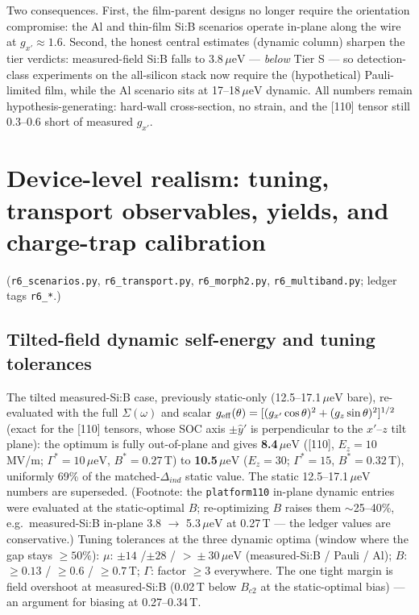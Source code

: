 \documentclass[11pt]{article}
\newcommand{\ueV}{\,\mu\mathrm{eV}}
\begin{document}
Two consequences. First, the film-parent designs no longer require the
orientation compromise: the Al and thin-film Si:B scenarios operate
in-plane along the wire at $g_{x'} \approx 1.6$. Second, the honest central
estimates (dynamic column) sharpen the tier verdicts: measured-field Si:B
falls to 3.8$\ueV$ --- \emph{below} Tier S --- so detection-class
experiments on the all-silicon stack now require the (hypothetical)
Pauli-limited film, while the Al scenario sits at 17--18$\ueV$ dynamic.
All numbers remain hypothesis-generating: hard-wall cross-section, no
strain, and the [110] tensor still 0.3--0.6 short of measured $g_{x'}$.

\section{Device-level realism: tuning, transport observables, yields, and
charge-trap calibration}\label{s:device}
(\texttt{r6\_scenarios.py}, \texttt{r6\_transport.py}, \texttt{r6\_morph2.py},
\texttt{r6\_multiband.py}; ledger tags \texttt{r6\_*}.)

\subsection{Tilted-field dynamic self-energy and tuning tolerances}
\label{s:tilt}
The tilted measured-Si:B case, previously static-only (12.5--17.1$\ueV$
bare), re-evaluated with the full $\Sigma(\omega)$ and scalar
$g_{\rm eff}(\theta) = [(g_{x'}\cos\theta)^2 + (g_z\sin\theta)^2]^{1/2}$
(exact for the [110] tensors, whose SOC axis $\pm\hat y'$ is perpendicular
to the $x'$--$z$ tilt plane): the optimum is fully out-of-plane and gives
\textbf{8.4$\ueV$} ([110], $E_z = 10$\,MV/m; $\Gamma^* = 10\ueV$,
$B^* = 0.27$\,T) to \textbf{10.5$\ueV$} ($E_z = 30$; $\Gamma^* = 15$,
$B^* = 0.32$\,T), uniformly 69\% of the matched-$\Delta_{ind}$ static
value. The static 12.5--17.1$\ueV$ numbers are superseded. (Footnote: the
\texttt{platform110} in-plane dynamic entries were evaluated at the
static-optimal $B$; re-optimizing $B$ raises them $\sim$25--40\%, e.g.\
measured-Si:B in-plane 3.8 $\to$ 5.3$\ueV$ at 0.27\,T --- the ledger
values are conservative.) Tuning tolerances at the three dynamic optima
(window where the gap stays $\ge 50\%$): $\mu$: $\pm14$ /$\pm28$ /
$>\!\pm30\ueV$ (measured-Si:B / Pauli / Al); $B$: $\ge 0.13$ / $\ge 0.6$ /
$\ge 0.7$\,T; $\Gamma$: factor $\ge 3$ everywhere. The one tight margin is
field overshoot at measured-Si:B (0.02\,T below $B_{c2}$ at the
static-optimal bias) --- an argument for biasing at 0.27--0.34\,T.
\end{document}
